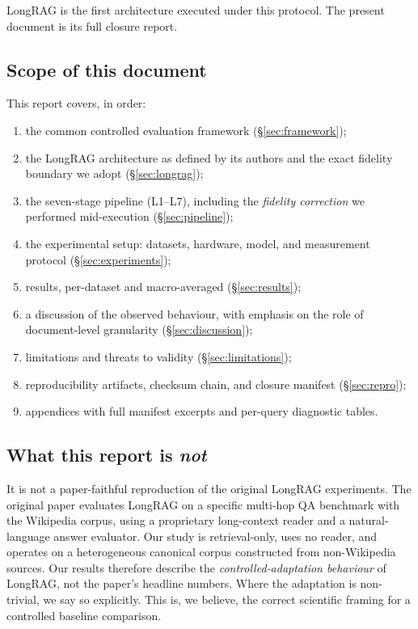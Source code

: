 \documentclass[11pt,a4paper]{article}
\begin{document}
LongRAG is the first architecture executed under this protocol. The
present document is its full closure report.

\subsection{Scope of this document}
This report covers, in order:
\begin{enumerate}[leftmargin=1.5em,itemsep=0.15em]
  \item the common controlled evaluation framework
    (\S\ref{sec:framework});
  \item the LongRAG architecture as defined by its authors and
    the exact fidelity boundary we adopt
    (\S\ref{sec:longrag});
  \item the seven-stage pipeline (L1--L7), including the
    \emph{fidelity correction} we performed mid-execution
    (\S\ref{sec:pipeline});
  \item the experimental setup: datasets, hardware, model, and
    measurement protocol (\S\ref{sec:experiments});
  \item results, per-dataset and macro-averaged
    (\S\ref{sec:results});
  \item a discussion of the observed behaviour, with emphasis on
    the role of document-level granularity
    (\S\ref{sec:discussion});
  \item limitations and threats to validity
    (\S\ref{sec:limitations});
  \item reproducibility artifacts, checksum chain, and closure
    manifest (\S\ref{sec:repro});
  \item appendices with full manifest excerpts and per-query
    diagnostic tables.
\end{enumerate}

\subsection{What this report is \emph{not}}
It is not a paper-faithful reproduction of the original LongRAG
experiments. The original paper evaluates LongRAG on a specific
multi-hop QA benchmark with the Wikipedia corpus, using a
proprietary long-context reader and a natural-language answer
evaluator. Our study is retrieval-only, uses no reader, and
operates on a heterogeneous canonical corpus constructed from
non-Wikipedia sources. Our results therefore describe the
\emph{controlled-adaptation behaviour} of LongRAG, not the paper's
headline numbers. Where the adaptation is non-trivial, we say so
explicitly. This is, we believe, the correct scientific framing for
a controlled baseline comparison.
\end{document}
